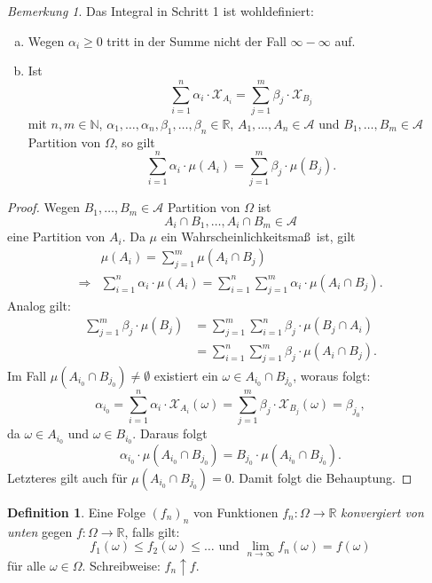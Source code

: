 \documentclass[a4paper,12pt,fleqn]{scrartcl}
\newcommand{\N}{\mathbb{N}}
\newcommand{\R}{\mathbb{R}}
\newcommand{\m}[1]{\mathcal{ #1 }}
\newcommand{\WM}{Wahrscheinlichkeitsmaß}
\newcommand{\impl}{\Rightarrow}
\theoremstyle{definition}
\newtheorem{definition}{Definition}[section]
\theoremstyle{plain}
\theoremstyle{remark}
\newtheorem*{bemerkung}{Bemerkung}
\begin{document}
\begin{bemerkung}
Das Integral in Schritt 1 ist wohldefiniert:
\begin{enumerate}[a)]
\item Wegen $\alpha_i \geq 0$ tritt in der Summe nicht der Fall $\infty - \infty$ auf.
\item Ist
\[\sum_{i=1}^n \alpha_i \cdot \m{X}_{A_i} = \sum_{j=1}^m \beta_j \cdot \m{X}_{B_j}\]
mit $n, m \in \N$, $\alpha_1 , \ldots , \alpha_n, \beta_1 , \ldots , \beta_n \in \R$, $A_1, \ldots , A_n \in \m{A}$ und $B_1, \ldots , B_m \in \m{A}$ Partition von $\Omega$, so gilt
\[\sum_{i=1}^n \alpha_i \cdot \mu(A_i) = \sum_{j=1}^m \beta_j \cdot \mu(B_j).\]
\end{enumerate}
\end{bemerkung}
\begin{proof}
Wegen $B_1, \ldots , B_m \in \m{A}$ Partition von $\Omega$ ist
\[A_i \cap B_1 , \ldots , A_i \cap B_m \in \m{A}\]
eine Partition von $A_i$. Da $\mu$ ein \WM \, ist, gilt
\begin{align*}
&\mu(A_i) = \sum_{j=1}^m \mu(A_i \cap B_j)\\
\impl & \sum_{i=1}^n \alpha_i \cdot \mu(A_i) = \sum_{i=1}^n \sum_{j=1}^m \alpha_i \cdot \mu(A_i \cap B_j).
\end{align*}
Analog gilt:
\begin{align*}
\sum_{j=1}^m \beta_j \cdot \mu(B_j) &= \sum_{j=1}^m \sum_{i=1}^n \beta_j \cdot \mu(B_j \cap A_i)\\
&= \sum_{i=1}^n \sum_{j=1}^m \beta_j \cdot \mu(A_i \cap B_j).
\end{align*}
Im Fall $\mu(A_{i_0} \cap B_{j_0}) \neq \emptyset$ existiert ein $\omega \in A_{i_0} \cap B_{j_0}$, woraus folgt:
\[\alpha_{i_0} = \sum_{i=1}^n \alpha_i \cdot \m{X}_{A_i}(\omega) = \sum_{j=1}^m \beta_j \cdot \m{X}_{B_j}(\omega) = \beta_{j_0},\]
da $\omega \in A_{i_0}$ und $\omega \in B_{i_0}$. Daraus folgt
\[\alpha_{i_0} \cdot \mu(A_{i_0} \cap B_{j_0}) = B_{j_0} \cdot \mu(A_{i_0} \cap B_{j_0}).\]
Letzteres gilt auch für $\mu(A_{i_0} \cap B_{j_0}) = 0$. Damit folgt die Behauptung.
\end{proof}
\begin{definition}
Eine Folge $(f_n)_n$ von Funktionen $f_n: \Omega \rightarrow \R$ \emph{konvergiert von unten} gegen $f: \Omega \rightarrow \R$, falls gilt:
\[f_1(\omega) \leq f_2(\omega) \leq \ldots \text{ und } \lim_{n \rightarrow \infty} f_n(\omega) = f(\omega)\]
für alle $\omega \in \Omega$. Schreibweise: $f_n \uparrow f$.
\end{definition}
\end{document}
